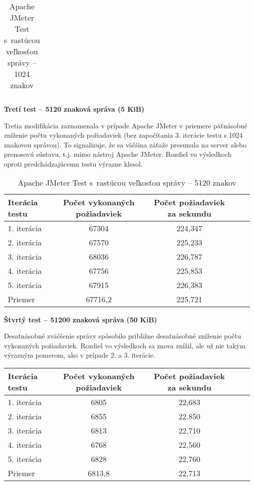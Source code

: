 \documentclass[12pt,oneside,final]{fithesis-utf8}
\begin{document}
\begin{itemize}
\begin{table}[H]
\begin{center}
\begin{tabular}{ | l | c | c | c | c |}
\end{tabular}
\end{center}
\caption{Apache JMeter Test s~rastúcou veľkosťou správy -- 1024 znakov}
\end{table}


\textbf{Tretí test -- 5120 znaková správa (5 KiB)}

Tretia modifikácia zaznamenala v prípade Apache JMeter v priemere päťnásobné zníženie počtu vykonaných požiadaviek (bez započítania 3. iterácie testu s 1024 znakovou správou). To signalizuje, že sa väčšina záťaže presunula na server alebo prenosovú sústavu, t.j. mimo nástroj Apache JMeter. Rozdiel vo výsledkoch oproti predchádzajúcemu testu výrazne klesol.

\begin{table}[H]
\begin{center}
\begin{tabular}{ | l | c | c | c | c |}
		\hline
		 \textbf{Iterácia testu} & \textbf{Počet vykonaných požiadaviek} & \textbf{Počet požiadaviek za sekundu} \\ \hline
		 1. iterácia & 67304 & 224,347 \\ \hline
		 2. iterácia & 67570 & 225,233 \\ \hline
		 3. iterácia & 68036 & 226,787 \\ \hline
		 4. iterácia & 67756 & 225,853 \\ \hline
		 5. iterácia & 67915 & 226,383 \\ \hline
		 Priemer & 67716,2 & 225,721 \\ \hline
		 
\end{tabular}
\end{center}
\caption{Apache JMeter Test s~rastúcou veľkosťou správy -- 5120 znakov}
\end{table}


\textbf{Štvrtý test -- 51200 znaková správa (50 KiB)}

Desaťnásobné zväčšenie správy spôsobilo približne desaťnásobné zníženie počtu vykonaných požiadaviek. Rozdiel vo výsledkoch sa znova znížil, ale už nie takým výrazným pomerom, ako v prípade 2. a 3. iterácie.

\begin{table}[H]
\begin{center}
\begin{tabular}{ | l | c | c | c | c |}
		\hline
		 \textbf{Iterácia testu} & \textbf{Počet vykonaných požiadaviek} & \textbf{Počet požiadaviek za sekundu} \\ \hline
		 1. iterácia & 6805 & 22,683 \\ \hline
		 2. iterácia & 6855 & 22,850 \\ \hline
		 3. iterácia & 6813 & 22,710 \\ \hline
		 4. iterácia & 6768 & 22,560 \\ \hline
		 5. iterácia & 6828 & 22,760 \\ \hline
		 Priemer & 6813,8 & 22,713 \\ \hline
		 

\end{tabular}
\end{center}
\end{table}
\end{itemize}
\end{document}
